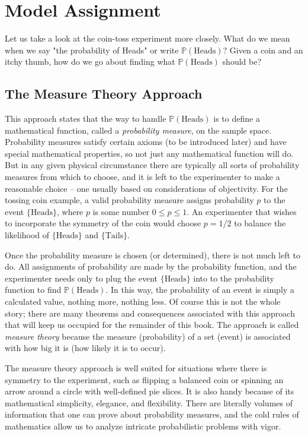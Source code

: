 \section{Model Assignment}
\label{sec-4-3}

Let us take a look at the coin-toss experiment more closely. What do
we mean when we say "the probability of Heads" or write
\(\mathbb{P}(\mbox{Heads})\)? Given a coin and an itchy thumb, how do
we go about finding what \(\mathbb{P}(\mbox{Heads})\) should be?

\subsection{The Measure Theory Approach}
\label{sec-4-3-1}

This approach states that the way to handle
\(\mathbb{P}(\mbox{Heads})\) is to define a mathematical function,
called a \emph{probability measure}, on the sample space. Probability
measures satisfy certain axioms (to be introduced later) and have
special mathematical properties, so not just any mathematical function
will do. But in any given physical circumstance there are typically
all sorts of probability measures from which to choose, and it is left
to the experimenter to make a reasonable choice -- one usually based
on considerations of objectivity. For the tossing coin example, a
valid probability measure assigns probability \(p\) to the event \( \{
\mbox{Heads} \} \), where \(p\) is some number \(0\leq p\leq1\). An
experimenter that wishes to incorporate the symmetry of the coin would
choose \(p=1/2\) to balance the likelihood of \( \{\mbox{Heads} \} \)
and \( \{ \mbox{Tails} \} \).

Once the probability measure is chosen (or determined), there is not
much left to do. All assignments of probability are made by the
probability function, and the experimenter needs only to plug the
event \(\{ \mbox{Heads} \}\) into to the probability function to find
\(\mathbb{P}(\mbox{Heads})\). In this way, the probability of an event
is simply a calculated value, nothing more, nothing less. Of course
this is not the whole story; there are many theorems and consequences
associated with this approach that will keep us occupied for the
remainder of this book. The approach is called \emph{measure theory}
because the measure (probability) of a set (event) is associated with
how big it is (how likely it is to occur).

The measure theory approach is well suited for situations where there
is symmetry to the experiment, such as flipping a balanced coin or
spinning an arrow around a circle with well-defined pie slices. It is
also handy because of its mathematical simplicity, elegance, and
flexibility. There are literally volumes of information that one can
prove about probability measures, and the cold rules of mathematics
allow us to analyze intricate probabilistic problems with vigor.

